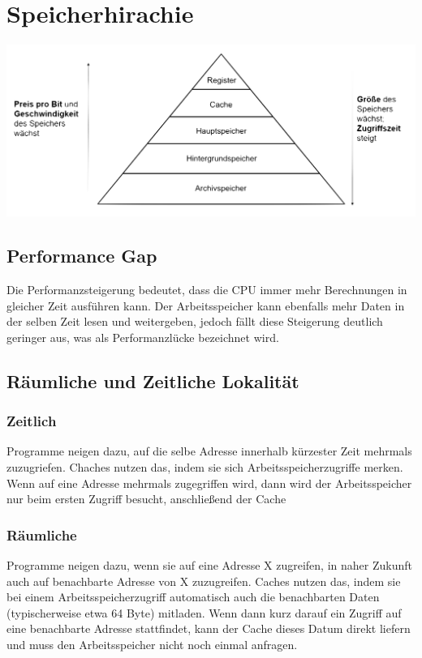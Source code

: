 \section{Speicherhirachie}
	\includegraphics[scale=0.5]{Speicherhierarchie.png}
	\subsection{Performance Gap}
		Die Performanzsteigerung bedeutet, dass die CPU immer mehr Berechnungen in gleicher Zeit ausführen kann. Der Arbeitsspeicher kann ebenfalls mehr Daten in der selben Zeit lesen und weitergeben, jedoch fällt diese Steigerung deutlich geringer aus, was als Performanzlücke bezeichnet wird.
	\subsection{Räumliche und Zeitliche Lokalität}
		\subsubsection{Zeitlich}
			Programme neigen dazu, auf die selbe Adresse innerhalb kürzester Zeit mehrmals zuzugriefen. Chaches nutzen das, indem sie sich Arbeitsspeicherzugriffe merken. Wenn auf eine Adresse mehrmals zugegriffen wird, dann wird der Arbeitsspeicher nur beim ersten Zugriff besucht, anschließend der Cache
		\subsubsection{Räumliche}
			Programme neigen dazu, wenn sie auf eine Adresse X zugreifen, in naher Zukunft auch auf benachbarte Adresse von X zuzugreifen. Caches nutzen das, indem sie bei einem Arbeitsspeicherzugriff automatisch auch die benachbarten Daten (typischerweise etwa 64 Byte) mitladen. Wenn dann kurz darauf ein Zugriff auf eine benachbarte Adresse stattfindet, kann der Cache dieses Datum direkt liefern und muss den Arbeitsspeicher nicht noch einmal anfragen.
			
			